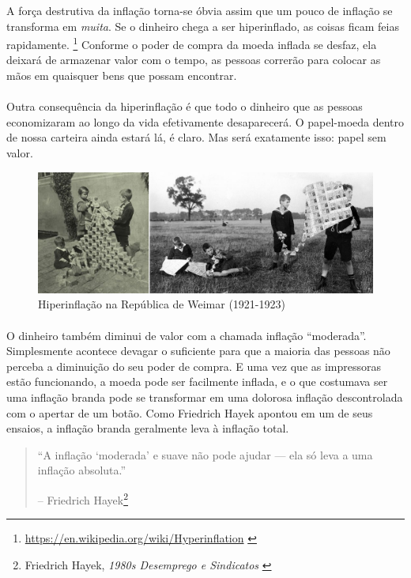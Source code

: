 A força destrutiva da inflação torna-se óbvia assim que um pouco de inflação se transforma em \textit{muita}. Se o dinheiro chega a ser hiperinflado, as coisas ficam feias rapidamente. \footnote{\url{https://en.wikipedia.org/wiki/Hyperinflation} \cite{wiki:hyperinflation}} Conforme o poder de compra da moeda inflada se desfaz, ela deixará de armazenar valor com o tempo, as pessoas correrão para colocar as mãos em quaisquer bens que possam encontrar.

\paragraph{}
Outra consequência da hiperinflação é que todo o dinheiro que as pessoas economizaram ao longo da vida efetivamente desaparecerá. O papel-moeda dentro de nossa carteira ainda estará lá, é claro. Mas será exatamente isso: papel sem valor.

\begin{figure}
  \includegraphics{assets/images/children-playing-with-money.png}
  \caption{Hiperinflação na República de Weimar (1921-1923)}
  \label{fig:children-playing-with-money}
\end{figure}

\paragraph{}
O dinheiro também diminui de valor com a chamada inflação \enquote{moderada}. Simplesmente acontece devagar o suficiente para que a maioria das pessoas não perceba a diminuição do seu poder de compra. E uma vez que as impressoras estão funcionando, a moeda pode ser facilmente inflada, e o que costumava ser uma inflação branda pode se transformar em uma dolorosa inflação descontrolada com o apertar de um botão. Como Friedrich Hayek apontou em um de seus ensaios, a inflação branda geralmente leva à inflação total.

\begin{quotation}\begin{samepage}
\enquote{A inflação `moderada' e suave não pode ajudar --- ela só leva a uma inflação absoluta.}
\begin{flushright} -- Friedrich Hayek\footnote{Friedrich Hayek, \textit{1980s
Desemprego e Sindicatos} \cite{hayek-inflation}}
\end{flushright}\end{samepage}\end{quotation}

